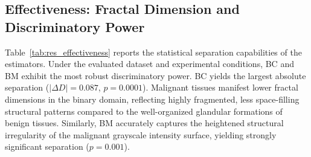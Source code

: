 \subsection{Effectiveness: Fractal Dimension and Discriminatory Power}
\label{subsec:res_effectiveness}

\begin{table}[h]
\centering
\caption{Mean fractal dimension $\bar{D}$ per class, inter-class separation $\Delta D$, mean $R^{2}$, and Welch $t$-test result ($\alpha = 0.05$). Naive and optimized formulations produced identical $D$ values.}
\label{tab:res_effectiveness}
\end{table}

Table~\ref{tab:res_effectiveness} reports the statistical separation capabilities of the estimators. Under the evaluated dataset and experimental conditions, BC and BM exhibit the most robust discriminatory power. BC yields the largest absolute separation ($|\Delta D| = 0.087$, $p = 0.0001$). Malignant tissues manifest lower fractal dimensions in the binary domain, reflecting highly fragmented, less space-filling structural patterns compared to the well-organized glandular formations of benign tissues. Similarly, BM accurately captures the heightened structural irregularity of the malignant grayscale intensity surface, yielding strongly significant separation ($p = 0.001$). 

